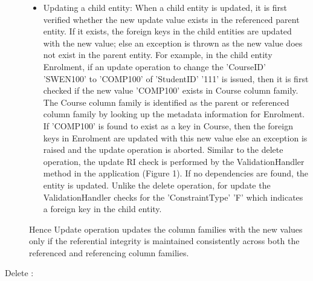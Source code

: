 \begin{description}
\begin{itemize}
\item Updating a child entity: When a child entity is updated, it is first
verified whether the new update value exists in the referenced parent entity. If it
exists, the foreign keys in the child entities are updated with the new value;
else an exception is thrown as the new value does not exist in the parent
entity. For example, in the child entity Enrolment, if an update operation to
change the 'CourseID' 'SWEN100' to 'COMP100' of 'StudentID' '111' is issued,
then it is first checked if the new value 'COMP100' exists in Course column
family. The Course column family is identified as the parent or referenced
column family by looking up the metadata information for Enrolment. If 'COMP100'
is found to exist as a key in Course, then the foreign keys in Enrolment are
updated with this new value else an exception is raised and the update operation
is aborted.
Similar to the delete operation, the update RI check is performed by the
ValidationHandler method in the application (Figure 1). If no dependencies are
found, the entity is updated. Unlike the delete operation, for update the
ValidationHandler checks for the 'ConstraintType' 'F' which indicates a foreign
key in the child entity.
\end {itemize}
Hence Update operation updates the column families with the new values only if
the referential integrity is maintained consistently across both the referenced
and referencing column families.


 \item  [Delete :] %


\end{description}

